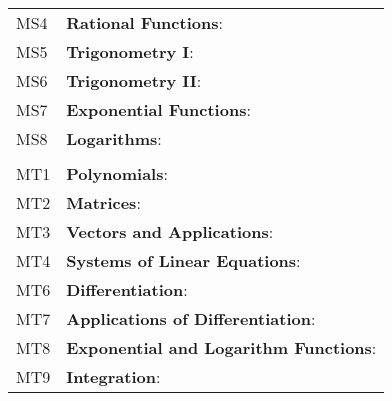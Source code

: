 \documentclass[varwidth=144mm, 12pt]{standalone}
\begin{document}
\begin{longtable}{lp{}}
MS4 & \textbf{Rational Functions}: \\
MS5 & \textbf{Trigonometry I}: \\
MS6 & \textbf{Trigonometry II}: \\
MS7 & \textbf{Exponential Functions}: \\
MS8 & \textbf{Logarithms}: \\
& \\
MT1 & \textbf{Polynomials}: \\
MT2 & \textbf{Matrices}: \\
MT3 & \textbf{Vectors and Applications}: \\
MT4 & \textbf{Systems of Linear Equations}: \\
MT6 & \textbf{Differentiation}: \\
MT7 & \textbf{Applications of Differentiation}: \\
MT8 & \textbf{Exponential and Logarithm Functions}: \\
MT9 & \textbf{Integration}: \\
\end{longtable}
\end{document}
